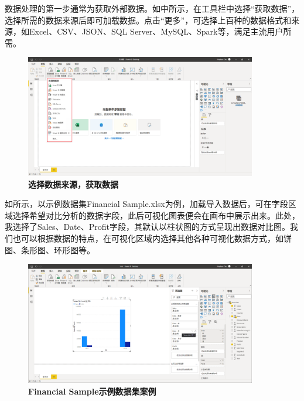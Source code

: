 数据处理的第一步通常为获取外部数据。如中所示，在工具栏中选择``获取数据''，选择所需的数据来源后即可加载数据。点击``更多''，可选择上百种的数据格式和来源，如Excel、CSV、JSON、SQL Server、MySQL、Spark等，满足主流用户所需。

\begin{figure}[htbp]
    \centering
    \includegraphics[width=0.9\textwidth]{figure/PowerBI/powerbi_load_data.png}
    \caption{\textbf{选择数据来源，获取数据}}
    \label{fig:powerbi_load_data}
\end{figure}

如所示，以示例数据集Financial Sample.xlsx为例，加载导入数据后，可在字段区域选择希望对比分析的数据字段，此后可视化图表便会在画布中展示出来。此处，我选择了Sales、Date、Profit字段，其默认以柱状图的方式呈现出数据对比图。我们也可以根据数据的特点，在可视化区域内选择其他各种可视化数据方式，如饼图、条形图、环形图等。

\begin{figure}[htbp]
    \centering
    \includegraphics[width=0.9\textwidth]{figure/PowerBI/powerbi_sale_profit_graph.png}
    \caption{\textbf{Financial Sample示例数据集案例}}
    \label{fig:powerbi_sale_profit_graph}
\end{figure}

